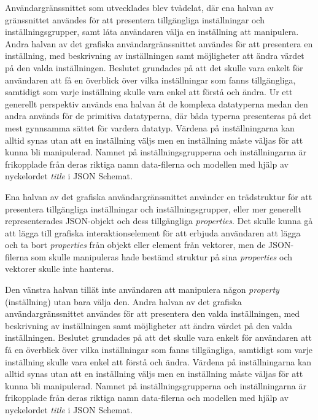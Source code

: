 Användargränssnittet som utvecklades blev tvådelat, där ena halvan av gränssnittet användes för att presentera tillgängliga inställningar och inställningsgrupper, samt låta användaren välja en inställning att manipulera. Andra halvan av det grafiska användargränssnittet användes för att presentera en inställning, med beskrivning av inställningen samt möjligheter att ändra värdet på den valda inställningen.  Beslutet grundades på att det skulle vara enkelt för användaren att få en överblick över vilka inställningar som fanns tillgängliga, samtidigt som varje inställning skulle vara enkel att förstå och ändra. Ur ett generellt perspektiv används ena halvan åt de komplexa datatyperna medan den andra används för de primitiva datatyperna, där båda typerna presenteras på det mest gynnsamma sättet för vardera datatyp. Värdena på inställningarna kan alltid synas utan att en inställning väljs men en inställning måste väljas för att kunna bli manipulerad. Namnet på inställningsgrupperna och inställningarna är frikopplade från deras riktiga namn data-filerna och modellen med hjälp av nyckelordet \textit{title} i JSON Schemat.

Ena halvan av det grafiska användargränssnittet använder en trädstruktur för att presentera tillgängliga inställningar och inställningsgrupper, eller mer generellt representerades JSON-objekt och dess tillgängliga \textit{properties}. Det skulle kunna gå att lägga till grafiska interaktionselement för att erbjuda användaren att lägga och ta bort \textit{properties} från objekt eller element från vektorer, men de JSON-filerna som skulle manipuleras hade bestämd struktur på sina \textit{properties} och vektorer skulle inte hanteras.


Den vänstra halvan tillät inte användaren att manipulera någon \textit{property} (inställning) utan bara välja den. Andra halvan av det grafiska användargränssnittet användes för att presentera den valda inställningen, med beskrivning av inställningen samt möjligheter att ändra värdet på den valda inställningen. Beslutet grundades på att det skulle vara enkelt för användaren att få en överblick över vilka inställningar som fanns tillgängliga, samtidigt som varje inställning skulle vara enkel att förstå och ändra. Värdena på inställningarna kan alltid synas utan att en inställning väljs men en inställning måste väljas för att kunna bli manipulerad. Namnet på inställningsgrupperna och inställningarna är frikopplade från deras riktiga namn data-filerna och modellen med hjälp av nyckelordet \textit{title} i JSON Schemat.

